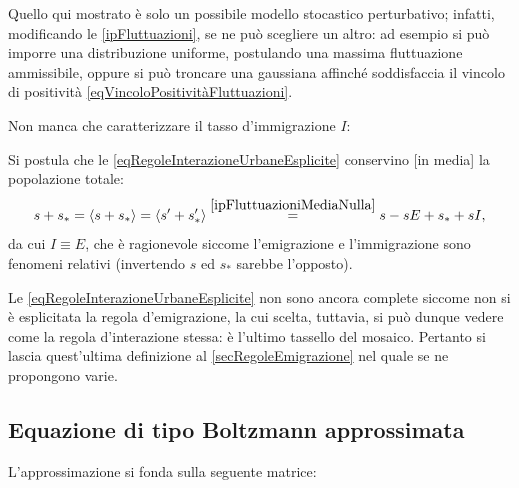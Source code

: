         \begin{oss}
          Quello qui mostrato è solo un possibile modello stocastico perturbativo; infatti, modificando le \cref{ipFluttuazioni}, se ne può scegliere un altro: ad esempio si può imporre una distribuzione uniforme, postulando una massima fluttuazione ammissibile, oppure si può troncare una gaussiana affinché soddisfaccia il vincolo di positività \cref{eqVincoloPositivitàFluttuazioni}.
        \end{oss}

        Non manca che caratterizzare il tasso d'immigrazione \(I\):

        \begin{ipo}%
          \label{ipConservazionePopolazioneMedia}
          Si postula che le \ref{eqRegoleInterazioneUrbaneEsplicite} conservino [in media] la popolazione totale:
          \begin{equation*}
            s+s_*=\langle s+s_*\rangle=
            \langle s'+s_*'\rangle
            \overset{\textsize{10}\ref{ipFluttuazioniMediaNulla}}{=}
            s-sE+s_*+sI,
          \end{equation*}
          da cui \(I\equiv E\), che è ragionevole siccome l'emigrazione e l'immigrazione sono fenomeni relativi (invertendo \(s\) ed \(s_*\) sarebbe l'opposto).
        \end{ipo}

        \begin{oss}
          \label{ossUguaglianzaInterazioneEmigrazione}
          Le \ref{eqRegoleInterazioneUrbaneEsplicite} non sono ancora complete siccome non si è esplicitata la regola d'emigrazione, la cui scelta, tuttavia, si può dunque vedere come la regola d'interazione stessa: è l'ultimo tassello del mosaico. Pertanto si lascia quest'ultima definizione al \cref{secRegoleEmigrazione} nel quale se ne propongono varie.
        \end{oss}
      
    \subsection{Equazione di tipo Boltzmann approssimata}\label{secApprossimazione}

      L'approssimazione si fonda sulla seguente matrice:
      
